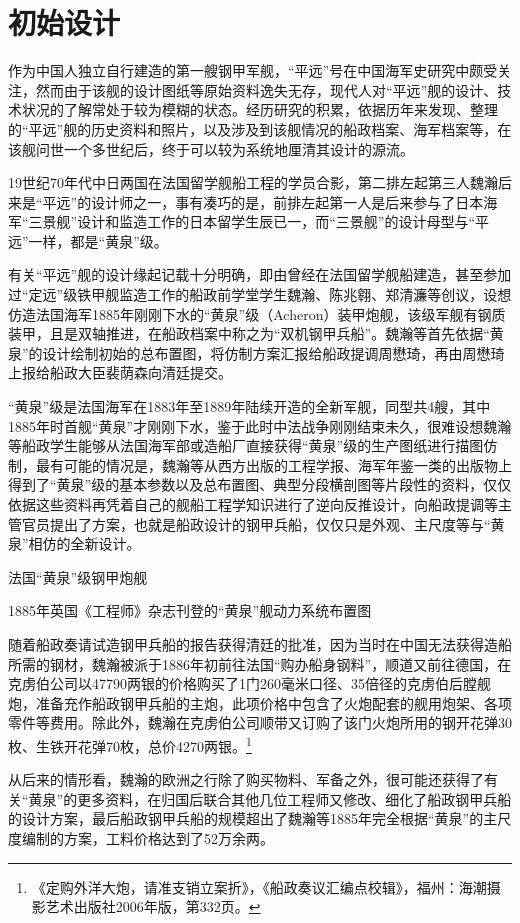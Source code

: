 \documentclass[12pt,UTF8]{ctexbook}
\begin{document}
\section{初始设计}

作为中国人独立自行建造的第一艘钢甲军舰，“平远”号在中国海军史研究中颇受关注，然而由于该舰的设计图纸等原始资料逸失无存，现代人对“平远”舰的设计、技术状况的了解常处于较为模糊的状态。经历研究的积累，依据历年来发现、整理的“平远”舰的历史资料和照片，以及涉及到该舰情况的船政档案、海军档案等，在该舰问世一个多世纪后，终于可以较为系统地厘清其设计的源流。

19世纪70年代中日两国在法国留学舰船工程的学员合影，第二排左起第三人魏瀚后来是“平远”的设计师之一，事有凑巧的是，前排左起第一人是后来参与了日本海军“三景舰”设计和监造工作的日本留学生辰已一，而“三景舰”的设计母型与“平远”一样，都是“黄泉”级。

有关“平远”舰的设计缘起记载十分明确，即由曾经在法国留学舰船建造，甚至参加过“定远”级铁甲舰监造工作的船政前学堂学生魏瀚、陈兆翱、郑清濂等创议，设想仿造法国海军1885年刚刚下水的“黄泉”级（Acheron）装甲炮舰，该级军舰有钢质装甲，且是双轴推进，在船政档案中称之为“双机钢甲兵船”。魏瀚等首先依据“黄泉”的设计绘制初始的总布置图，将仿制方案汇报给船政提调周懋琦，再由周懋琦上报给船政大臣裴荫森向清廷提交。

“黄泉”级是法国海军在1883年至1889年陆续开造的全新军舰，同型共4艘，其中1885年时首舰“黄泉”才刚刚下水，鉴于此时中法战争刚刚结束未久，很难设想魏瀚等船政学生能够从法国海军部或造船厂直接获得“黄泉”级的生产图纸进行描图仿制，最有可能的情况是，魏瀚等从西方出版的工程学报、海军年鉴一类的出版物上得到了“黄泉”级的基本参数以及总布置图、典型分段横剖图等片段性的资料，仅仅依据这些资料再凭着自己的舰船工程学知识进行了逆向反推设计，向船政提调等主管官员提出了方案，也就是船政设计的钢甲兵船，仅仅只是外观、主尺度等与“黄泉”相仿的全新设计。

法国“黄泉”级钢甲炮舰

1885年英国《工程师》杂志刊登的“黄泉”舰动力系统布置图

随着船政奏请试造钢甲兵船的报告获得清廷的批准，因为当时在中国无法获得造船所需的钢材，魏瀚被派于1886年初前往法国“购办船身钢料”，顺道又前往德国，在克虏伯公司以47790两银的价格购买了1门260毫米口径、35倍径的克虏伯后膛舰炮，准备充作船政钢甲兵船的主炮，此项价格中包含了火炮配套的舰用炮架、各项零件等费用。除此外，魏瀚在克虏伯公司顺带又订购了该门火炮所用的钢开花弹30枚、生铁开花弹70枚，总价4270两银。\footnote{《定购外洋大炮，请准支销立案折》，《船政奏议汇编点校辑》，福州：海潮摄影艺术出版社2006年版，第332页。}

从后来的情形看，魏瀚的欧洲之行除了购买物料、军备之外，很可能还获得了有关“黄泉”的更多资料，在归国后联合其他几位工程师又修改、细化了船政钢甲兵船的设计方案，最后船政钢甲兵船的规模超出了魏瀚等1885年完全根据“黄泉”的主尺度编制的方案，工料价格达到了52万余两。
\end{document}
